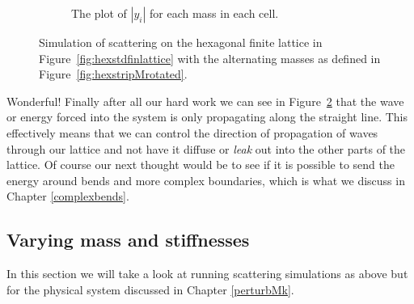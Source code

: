 \begin{figure}
\begin{subfigure}[b]{.5\textwidth}
  \caption{The plot of $|y_i|$ for each mass in each cell.}
  \label{fig:sub2}
\end{subfigure}
\caption{Simulation of scattering on the hexagonal finite lattice in
  Figure~\ref{fig:hexstdfinlattice} with the alternating masses as defined in
  Figure~\ref{fig:hexstripMrotated}.}
\label{fig:hexstdrotstraight}
\end{figure}

Wonderful! Finally after all our hard work we can see in
Figure~\ref{fig:hexstdrotstraight} that the wave or energy forced into the
system is only propagating along the straight line. This effectively means that
we can control the direction of propagation of waves through our lattice and
not have it diffuse or \textit{leak} out into the other parts of the lattice.
Of course our next thought would be to see if it is possible to send the energy
around bends and more complex boundaries, which is what we discuss in Chapter
\ref{complexbends}.

\subsection{Varying mass and stiffnesses}
In this section we will take a look at running scattering simulations as above
but for the physical system discussed in Chapter \ref{perturbMk}.


